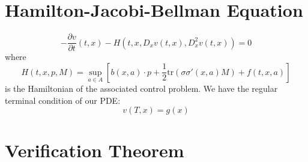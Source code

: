 \section{Hamilton-Jacobi-Bellman Equation}
$$-\frac{\partial v}{\partial t}(t,x)-H(t,x,D_xv(t,x),D^2_xv(t,x))=0$$
where
$$H(t,x,p,M)=\sup\limits_{a\in A}\left[b(x,a)\cdot p+\frac{1}{2}\textrm{tr}(\sigma\sigma'(x,a)M)+f(t,x,a)\right]$$
is the Hamiltonian of the associated control problem. We have the regular terminal condition of our PDE:
$$v(T,x)=g(x)$$
\section{Verification Theorem}